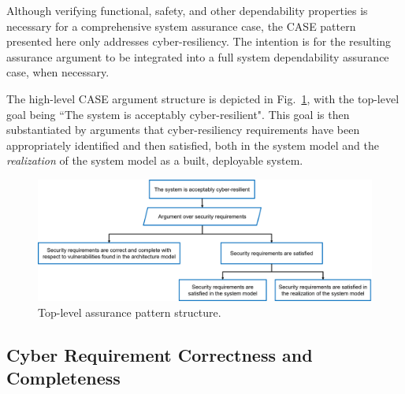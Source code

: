 Although verifying functional, safety, and other dependability properties is necessary for a comprehensive system assurance case, the CASE pattern presented here only addresses cyber-resiliency.  The intention is for the resulting assurance argument to be integrated into a full system dependability assurance case, when necessary.

The high-level CASE argument structure is depicted in Fig.~\ref{fig:top-level}, with the top-level goal being ``The system is acceptably cyber-resilient".  
This goal is then substantiated by arguments that cyber-resiliency requirements have been appropriately identified and then satisfied, both in the system model and the \textit{realization} of the system model as a built, deployable system.

\begin{figure}[h] 
	\centering 
	\includegraphics[width=\textwidth]{figs/top-level.png}
	\caption{Top-level assurance pattern structure.}
	\label{fig:top-level} 
\end{figure}



\subsection{Cyber Requirement Correctness and Completeness}


